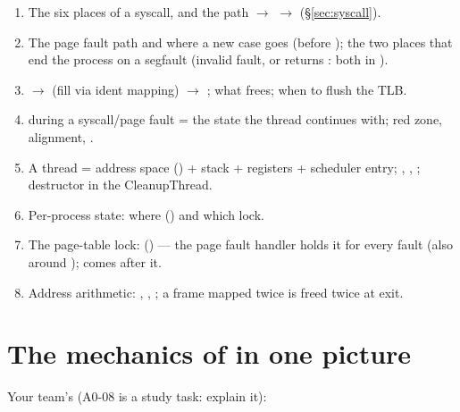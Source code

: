 \begin{enumerate}
\item The six places of a syscall, and the path  $\to$ 
  $\to$  (\S\ref{sec:syscall}).
\item The page fault path and where a new case goes (before ); the two places
  that end the process on a segfault (invalid fault, or  returns : both  in ).
\item {} $\to$ (fill via ident mapping) $\to$ ; what
   frees; when to flush the TLB.
\item {} during a syscall/page fault = the state the thread continues
  with; red zone, alignment, .
\item A thread = address space () + stack + registers + scheduler entry;
  , , ; destructor in the
  CleanupThread.
\item Per-process state: where () and which lock.
\item The page-table lock:  () --- the page fault handler
  holds it for every fault (also around );  comes after it.
\item Address arithmetic: , ,
  ; a frame mapped twice is freed twice at exit.
\end{enumerate}

\section{The mechanics of  in one picture}

Your team's  (A0-08 is a study task: explain it):

